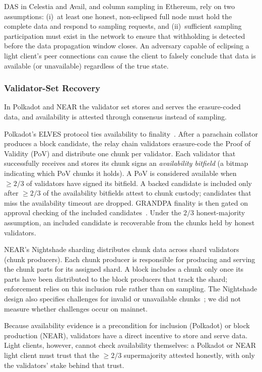 DAS in Celestia and Avail, and column sampling in Ethereum, rely on two assumptions: (i)~at least one honest, non-eclipsed full node must hold the complete data and respond to sampling requests, and (ii)~sufficient sampling participation must exist in the network to ensure that withholding is detected before the data propagation window closes.
An adversary capable of eclipsing a light client's peer connections can cause the client to falsely conclude that data is available (or unavailable) regardless of the true state.

\subsubsection{Validator-Set Recovery}

In Polkadot and NEAR the validator set stores and serves the erasure-coded data, and availability is attested through consensus instead of sampling.

Polkadot's ELVES protocol ties availability to finality~\cite{Jeff_Burdges_ELVES}.
After a parachain collator produces a block candidate, the relay chain validators erasure-code the Proof of Validity (PoV) and distribute one chunk per validator.
Each validator that successfully receives and stores its chunk signs an \emph{availability bitfield} (a bitmap indicating which PoV chunks it holds).
A PoV is considered available when $\geq 2/3$ of validators have signed its bitfield.
A backed candidate is included only after $\geq 2/3$ of the availability bitfields attest to chunk custody; candidates that miss the availability timeout are dropped. GRANDPA finality is then gated on approval checking of the included candidates~\cite{Jeff_Burdges_ELVES, Overview_of_polkadot}.
Under the $2/3$ honest-majority assumption, an included candidate is recoverable from the chunks held by honest validators.

NEAR's Nightshade sharding distributes chunk data across shard validators (chunk producers).
Each chunk producer is responsible for producing and serving the chunk parts for its assigned shard.
A block includes a chunk only once its parts have been distributed to the block producers that track the shard; enforcement relies on this inclusion rule rather than on sampling. The Nightshade design also specifies challenges for invalid or unavailable chunks~\cite{NEAR_Nightshade_Scaling_Blockchain}; we did not measure whether challenges occur on mainnet.

Because availability evidence is a precondition for inclusion (Polkadot) or block production (NEAR), validators have a direct incentive to store and serve data.
Light clients, however, cannot check availability themselves: a Polkadot or NEAR light client must trust that the $\geq 2/3$ supermajority attested honestly, with only the validators' stake behind that trust.

